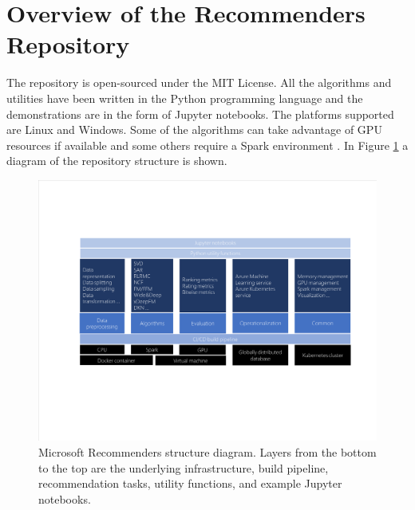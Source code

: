 \section{Overview of the Recommenders Repository}

The repository is open-sourced under the MIT License. All the algorithms and utilities have been written in the Python programming language and the demonstrations are 
in the form of Jupyter notebooks.
The platforms supported are Linux and Windows. Some of the algorithms can take advantage of GPU resources if available 
and some others require a Spark environment \cite{meng2016mllib}. In Figure \ref{figure_structure} a diagram of the repository structure is shown.

\begin{figure}
  \centering
  \includegraphics[width=\textwidth,keepaspectratio]{platform_diagram_crop.pdf}
  \caption{Microsoft Recommenders structure diagram. Layers from the bottom to the top are the underlying 
  infrastructure, build pipeline, recommendation tasks, utility functions, and example Jupyter notebooks.}
  \label{figure_structure}
\end{figure}

%
%
